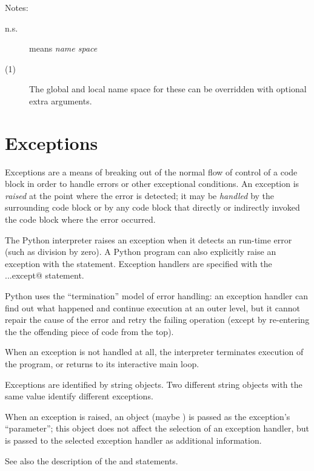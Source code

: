 Notes:

\begin{description}

\item[n.s.] means {\em name space}

\item[(1)] The global and local name space for these can be
overridden with optional extra arguments.

\end{description}

\section{Exceptions}

Exceptions are a means of breaking out of the normal flow of control
of a code block in order to handle errors or other exceptional
conditions.  An exception is {\em raised} at the point where the error
is detected; it may be {\em handled} by the surrounding code block or
by any code block that directly or indirectly invoked the code block
where the error occurred.

The Python interpreter raises an exception when it detects an run-time
error (such as division by zero).  A Python program can also
explicitly raise an exception with the \verb@raise@ statement.
Exception handlers are specified with the \verb@try...except@
statement.

Python uses the ``termination'' model of error handling: an exception
handler can find out what happened and continue execution at an outer
level, but it cannot repair the cause of the error and retry the
failing operation (except by re-entering the the offending piece of
code from the top).

When an exception is not handled at all, the interpreter terminates
execution of the program, or returns to its interactive main loop.

Exceptions are identified by string objects.  Two different string
objects with the same value identify different exceptions.

When an exception is raised, an object (maybe \verb@None@) is passed
as the exception's ``parameter''; this object does not affect the
selection of an exception handler, but is passed to the selected
exception handler as additional information.

See also the description of the \verb@try@ and \verb@raise@
statements.
